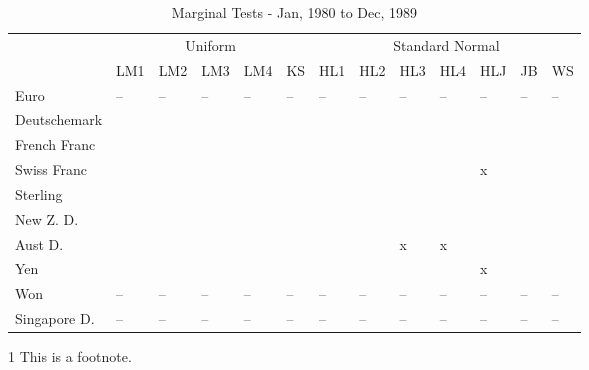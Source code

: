 \documentclass[12pt]{article}
\begin{document}
\begin{table}
	\caption{Marginal Tests - Jan, 1980 to Dec, 1989}
	\begin{threeparttable}
		\begin{tabular}[l]{l l l l l l l l l l l l l}
	    \hline
	& \multicolumn{5}{c}{Uniform}  & \multicolumn{7}{c}{Standard Normal} \\
			            & LM1        & LM2        & LM3        & LM4        & KS         & HL1        & HL2        & HL3        & HL4        & HLJ        & JB         & WS \\
	\hline
	    Euro            & --  & --  & --  & --  & -- & --  & --  & --  & --  & --  & -- & -- \\
		Deutschemark    & \checkplus & \checkplus & \checkplus & \checkplus & \checkplus & \checkplus & \checkplus & \checkplus & \checkplus & \checkplus & \checkplus & \checkplus \\
		French Franc    & \checkplus & \checkplus & \checkplus & \checkplus & \checkplus & \checkplus & \checkplus & \checkplus & \checkplus & \checkplus & \checkplus & \checkplus \\
		Swiss Franc     & \checkplus & \checkplus & \checkplus & \checkplus & \checkplus & \checkplus & \checkplus & \checkplus & \checkplus & x          & \checkplus & \checkplus \\
		Sterling        & \checkplus & \checkplus & \checkplus & \checkplus & \checkplus & \checkplus & \checkplus & \checkplus & \checkplus & \checkplus & \checkplus & \checkplus \\
		New Z. D.       &  &  &  &  &  &  &  & \\
		Aust D.         & \checkplus & \checkplus & \checkplus & \checkplus & \checkplus & \checkplus & \checkplus & x          & x          & \checkplus & \checkplus & \checkplus \\
		Yen             & \checkplus & \checkplus & \checkplus & \checkplus & \checkplus & \checkplus & \checkplus & \checkplus & \checkplus & x          & \checkplus & \checkplus \\
		Won             & --  & --  & --  & --  & -- & --  & --  & --  & --  & --  & -- & -- \\
		Singapore D.    & --  & --  & --  & --  & -- & --  & --  & --  & --  & --  & -- & -- \\
	\hline
		\end{tabular}
		\begin{tablenotes}
			\item[1]{\footnotesize This is a footnote.}
		\end{tablenotes}
	\end{threeparttable}
\end{table}
\end{document}
